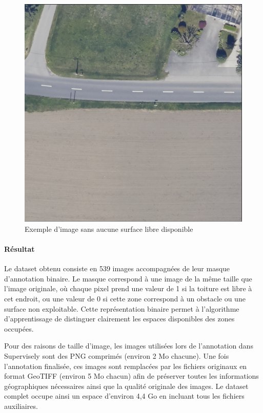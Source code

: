 \begin{figure}[H]
    \centering
    \includegraphics[width=1\linewidth]{02-main/figures/ch3/ch3_labellisation_02_exemples_04_image_non_annotee.png}
    \caption{Exemple d'image sans aucune surface libre disponible}
    \label{fig:ch3_labellisation_02_exemples_04_image_non_annotee}
\end{figure}

\paragraph{Résultat}
Le dataset obtenu consiste en 539 images accompagnées de leur masque d'annotation binaire. Le masque correspond à une image de la même taille que l'image originale, où chaque pixel prend une valeur de 1 si la toiture est libre à cet endroit, ou une valeur de 0 si cette zone correspond à un obstacle ou une surface non exploitable. Cette représentation binaire permet à l'algorithme d'apprentissage de distinguer clairement les espaces disponibles des zones occupées.

Pour des raisons de taille d'image, les images utilisées lors de l'annotation dans Supervisely sont des PNG comprimés (environ 2 Mo chacune). Une fois l'annotation finalisée, ces images sont remplacées par les fichiers originaux en format GeoTIFF (environ 5 Mo chacun) afin de préserver toutes les informations géographiques nécessaires ainsi que la qualité originale des images. Le dataset complet occupe ainsi un espace d'environ 4,4 Go en incluant tous les fichiers auxiliaires.

